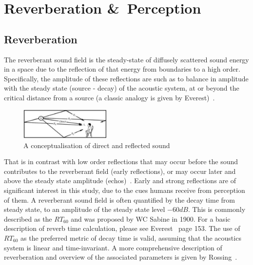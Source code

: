 \documentclass[paper=a4, fontsize=10pt, font=arial]{scrartcl} %
\numberwithin{equation}{section} %
\numberwithin{figure}{section} %
\numberwithin{table}{section} %
\begin{document}
\newpage
\section{Reverberation \&\ Perception}
\subsection{Reverberation}

The reverberant sound field is the steady-state of diffusely scattered sound energy in a space due to the reflection of that energy from boundaries to a high order. 
Specifically, the amplitude of these reflections are such as to balance in amplitude with the steady state (source - decay) of the acoustic system, at or beyond the critical distance from a source (a classic analogy is given by Everest)~\cite{Everest2009}. 

\begin{figure}[H]
\centering
\includegraphics[width=0.4\textwidth]{reflection_diagran.jpg}
\centering
\caption{A conceptualisation of direct and reflected sound~\cite{Everest2009}}
\end{figure}

That is in contrast with low order reflections that may occur before the sound contributes to the reverberant field (early reflections), or may occur later and above the steady state amplitude (echos)~\cite{Everest2009}. 
Early and strong reflections are of significant interest in this study, due to the cues humans receive from perception of them. 
A reverberant sound field is often quantified by the decay time from steady state, to an amplitude of the steady state level $-60{dB}$. This is commonly described as the $RT_{60}$ and was proposed by WC Sabine in 1900. For a basic description of reverb time calculation, please see Everest~\cite{Everest2009} page 153.
The use of $RT_{60}$ as the preferred metric of decay time is valid, assuming that the acoustics system is linear and time-invariant.
A more comprehensive description of reverberation and overview of the associated parameters is given by Rossing~\cite{rossing2007springer}. 
\end{document}
